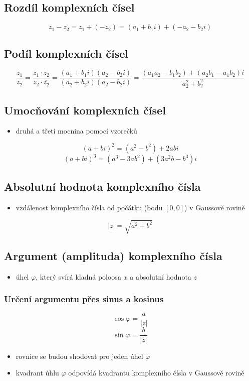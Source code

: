     
\subsection{Rozdíl komplexních čísel}
    $$
        z_1-z_2=z_1+(-z_2)=(a_1+b_1i)+(-a_2-b_2i)
    $$
    
\subsection{Podíl komplexních čísel}
    $$
        \frac{z_1}{z_2}=\frac{z_1 \cdot \overline{z_2}}{z_2 \cdot \overline{z_2}}=\frac{(a_1+b_1i)(a_2-b_2i)}{(a_2+b_2i)(a_2-b_2i)}=\frac{(a_1a_2-b_1b_2)+(a_2b_1-a_1b_2)i}{a_2^2+b_2^2}
    $$
    
\subsection{Umocňování komplexních čísel}
    \begin{itemize}
        \item druhá a třetí mocnina pomocí vzorečků
    \end{itemize}
    $$
        (a + bi)^2 = (a^2 - b^2) + 2abi
    $$
    $$
        (a + bi)^3 = (a^3 - 3ab^2) + (3a^2b - b^3)i
    $$
\subsection{Absolutní hodnota komplexního čísla}
    \begin{itemize}
        \item vzdálenost komplexního čísla od počátku (bodu $[0,0]$) v Gaussově rovině
    \end{itemize}
    $$
        |z|=\sqrt{a^2+b^2}
    $$
\subsection{Argument (amplituda) komplexního čísla}
    \begin{itemize}
        \item úhel $\varphi$, který svírá kladná poloosa $x$ a absolutní hodnota $z$
    \end{itemize}
    \subsubsection{Určení argumentu přes sinus a kosinus}
        $$
            \cos{\varphi} = \frac{a}{|z|}
        $$
        $$
            \sin{\varphi} = \frac{b}{|z|}
        $$
        \begin{itemize}
            \item rovnice se budou shodovat pro jeden úhel $\varphi$
            \item kvadrant úhlu $\varphi$ odpovídá kvadrantu komplexního čísla v Gaussově rovině
        \end{itemize}
